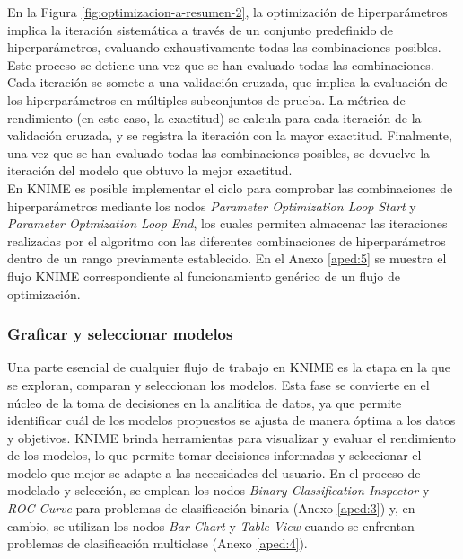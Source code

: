 En la Figura \ref{fig:optimizacion-a-resumen-2}, la optimización de hiperparámetros implica la iteración sistemática a través de un conjunto predefinido de hiperparámetros, evaluando exhaustivamente todas las combinaciones posibles. Este proceso se detiene una vez que se han evaluado todas las combinaciones. Cada iteración se somete a una validación cruzada, que implica la evaluación de los hiperparámetros en múltiples subconjuntos de prueba. La métrica de rendimiento (en este caso, la exactitud) se calcula para cada iteración de la validación cruzada, y se registra la iteración con la mayor exactitud. Finalmente, una vez que se han evaluado todas las combinaciones posibles, se devuelve la iteración del modelo que obtuvo la mejor exactitud. \\
En KNIME es posible implementar el ciclo para comprobar las combinaciones de hiperparámetros mediante los nodos \textit{Parameter Optimization Loop Start} y \textit{Parameter Optmization Loop End}, los cuales permiten almacenar las iteraciones realizadas por el algoritmo con las diferentes combinaciones de hiperparámetros dentro de un rango previamente establecido. En el Anexo \ref{aped:5} se muestra el flujo KNIME correspondiente al funcionamiento genérico de un flujo de optimización.

\subsubsection*{Graficar y seleccionar modelos}
Una parte esencial de cualquier flujo de trabajo en KNIME es la etapa en la que se exploran, comparan y seleccionan los modelos. Esta fase se convierte en el núcleo de la toma de decisiones en la analítica de datos, ya que permite identificar cuál de los modelos propuestos se ajusta de manera óptima a los datos y objetivos.
KNIME brinda herramientas para visualizar y evaluar el rendimiento de los modelos, lo que permite tomar decisiones informadas y seleccionar el modelo que mejor se adapte a las necesidades del usuario. En el proceso de modelado y selección, se emplean los nodos \textit{Binary Classification Inspector} y \textit{ROC Curve} para problemas de clasificación binaria (Anexo \ref{aped:3}) y, en cambio, se utilizan los nodos \textit{Bar Chart} y \textit{Table View} cuando se enfrentan problemas de clasificación multiclase (Anexo \ref{aped:4}).


